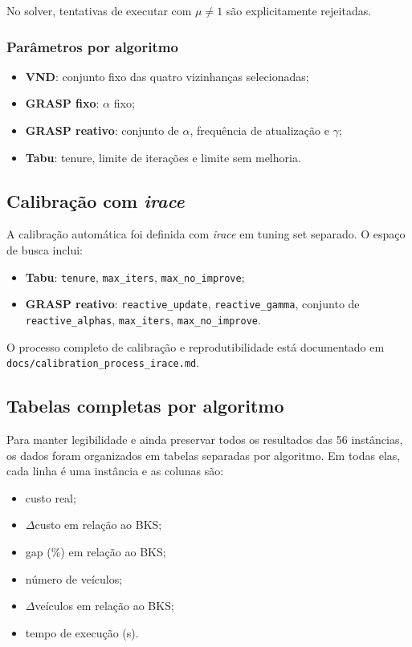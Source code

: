 No solver, tentativas de executar com $\mu\neq 1$ são explicitamente rejeitadas.

\subsubsection{Parâmetros por algoritmo}

\begin{itemize}
  \item \textbf{VND}: conjunto fixo das quatro vizinhanças selecionadas;
  \item \textbf{GRASP fixo}: $\alpha$ fixo;
  \item \textbf{GRASP reativo}: conjunto de $\alpha$, frequência de atualização e $\gamma$;
  \item \textbf{Tabu}: tenure, limite de iterações e limite sem melhoria.
\end{itemize}

\subsection{Calibração com \emph{irace}}

A calibração automática foi definida com \emph{irace} \cite{lopez2016irace} em tuning set separado.
O espaço de busca inclui:
\begin{itemize}
  \item \textbf{Tabu}: \texttt{tenure}, \texttt{max\_iters}, \texttt{max\_no\_improve};
  \item \textbf{GRASP reativo}: \texttt{reactive\_update}, \texttt{reactive\_gamma}, conjunto de \texttt{reactive\_alphas}, \texttt{max\_iters}, \texttt{max\_no\_improve}.
\end{itemize}

O processo completo de calibração e reprodutibilidade está documentado em \texttt{docs/calibration\_process\_irace.md}.

\subsection{Tabelas completas por algoritmo}
\label{subsec:tabelas_por_algoritmo}

Para manter legibilidade e ainda preservar todos os resultados das 56 instâncias, os dados foram organizados em tabelas separadas por algoritmo.
Em todas elas, cada linha é uma instância e as colunas são:
\begin{itemize}
  \item custo real;
  \item $\Delta$custo em relação ao BKS;
  \item gap (\%) em relação ao BKS;
  \item número de veículos;
  \item $\Delta$veículos em relação ao BKS;
  \item tempo de execução (s).
\end{itemize}

